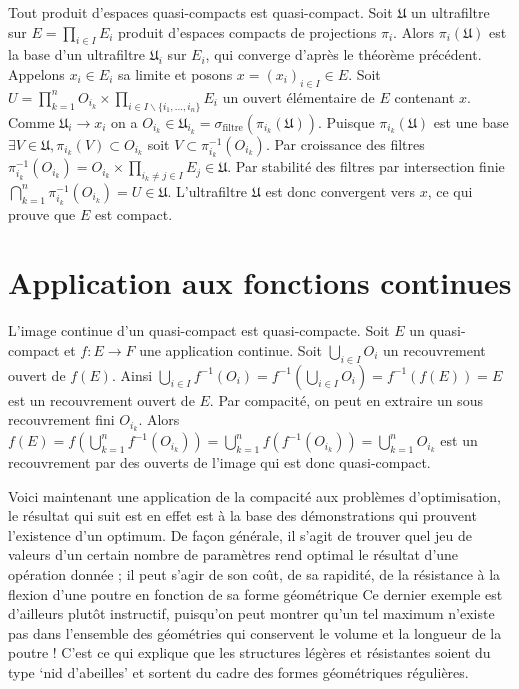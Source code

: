 \documentclass[a4paper, 11pt, french]{book}
\theoremstyle{plain} %
\theoremstyle{definition} %
\theoremstyle{remark} %
\renewcommand{\setminus}{\backslash}
\newcommand{\1}{\mathds{1}}
\newcommand{\inv}[1]{#1^{-1}}
\begin{document}
\proposition
Tout produit d’espaces quasi-compacts est quasi-compact.
\demonstration
Soit $\mathfrak{U}$ un ultrafiltre sur $E=\prod_{i\in I}E_i$ produit d'espaces compacts de projections $\pi_i$.
Alors $\pi_i(\mathfrak{U})$ est la base d'un ultrafiltre $\mathfrak{U}_i$ sur $E_i$, qui converge d'après le théorème précédent.
Appelons $x_i\in E_i$ sa limite et posons $x=(x_i)_{i\in I}\in E$.
Soit $U=\prod_{k=1}^nO_{i_k}\times\prod_{i\in I\setminus\{i_1, ..., i_n\}}E_i$ un ouvert élémentaire de $E$ contenant $x$.
Comme $\mathfrak{U}_i\rightarrow x_i$ on a $O_{i_k}\in\mathfrak{U}_{i_k}=\sigma_\text{filtre}(\pi_{i_k}(\mathfrak{U}))$.
Puisque $\pi_{i_k}(\mathfrak{U})$ est une base $\exists V\in\mathfrak{U}, \pi_{i_k}(V)\subset O_{i_k}$ soit $V\subset\inv{\pi_{i_k}}(O_{i_k})$.
Par croissance des filtres $\inv{\pi_{i_k}}(O_{i_k})=O_{i_k}\times\prod_{i_k\neq j\in I}E_j\in\mathfrak{U}$.
Par stabilité des filtres par intersection finie $\bigcap_{k=1}^n\inv{\pi_{i_k}}(O_{i_k})=U\in\mathfrak{U}$.
L’ultrafiltre $\mathfrak{U}$ est donc convergent vers $x$, ce qui prouve que $E$ est compact.

\section{Application aux fonctions continues}

\proposition
L’image continue d’un quasi-compact est quasi-compacte.
\demonstration
Soit $E$ un quasi-compact et $f:E\rightarrow F$ une application continue.
Soit $\bigcup_{i\in I}O_i$ un recouvrement ouvert de $f(E)$.
Ainsi $\bigcup_{i\in I}\inv{f}(O_i)=\inv{f}(\bigcup_{i\in I}O_i)=\inv{f}(f(E))=E$ est un recouvrement ouvert de $E$.
Par compacité, on peut en extraire un sous recouvrement fini $O_{i_k}$.
Alors $f(E)=f(\bigcup_{k=1}^n\inv{f}(O_{i_k}))=\bigcup_{k=1}^nf(\inv{f}(O_{i_k}))=\bigcup_{k=1}^nO_{i_k}$ est un recouvrement par des ouverts de l'image qui est donc quasi-compact.

\remarque
Voici maintenant une application de la compacité aux problèmes d’optimisation, le résultat qui suit est en effet est à la base des démonstrations qui prouvent l’existence d’un optimum.
De façon générale, il s’agit de trouver quel jeu de valeurs d’un certain nombre de paramètres rend optimal le résultat d’une opération donnée ; il peut s’agir de son coût, de sa rapidité, de la résistance à la flexion d’une poutre en fonction de sa forme géométrique Ce dernier exemple est d’ailleurs plutôt instructif, puisqu’on peut montrer qu’un tel maximum n’existe pas dans l’ensemble des géométries qui conservent le volume et la longueur de la poutre !
C’est ce qui explique que les structures légères et résistantes soient du type ‘nid d’abeilles’ et sortent du cadre des formes géométriques régulières.
\end{document}
